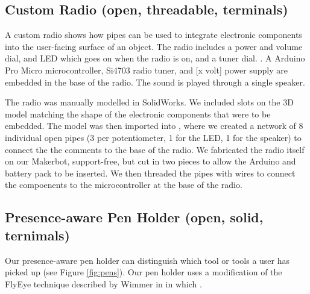 \subsection{Custom Radio (open, threadable, terminals)}
A custom radio shows how pipes can be used to integrate electronic components into the user-facing surface of an object. The radio includes a power and volume dial, and LED which goes on when the radio is on, and a tuner dial. . A Arduino Pro Micro microcontroller, Si4703 radio tuner, and  [x volt] power supply are embedded in the base of the radio. The sound is played through a single speaker. 

The radio was manually modelled in SolidWorks. We included slots on the 3D model matching the shape of the electronic components that were to be embedded. The model was then imported into \systemnamenospace, where we created a network of 8 individual open pipes (3 per potentiometer, 1 for the LED, 1 for the speaker) to connect the the comments to the base of the radio. We fabricated the radio itself on our Makerbot, support-free, but cut in two pieces to allow the Arduino and battery pack to be inserted. We then threaded the pipes with wires to connect the compoenents to the microcontroller at the base of the radio. 


\subsection{Presence-aware Pen Holder (open, solid, ternimals)}
 
Our presence-aware pen holder can distinguish which tool or tools a user has picked up (see Figure \ref{fig:pens}).  Our pen holder uses a modification of the FlyEye technique described by Wimmer in \cite{Wimmer-flyeye} in which . 

